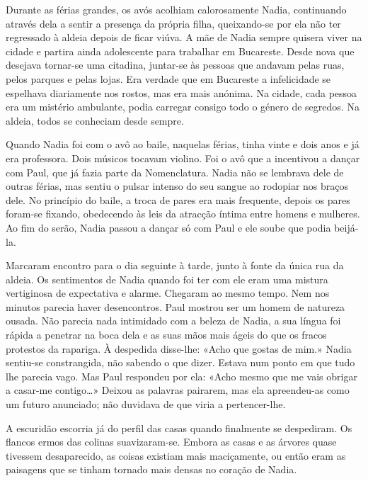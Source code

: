 Durante as férias grandes, os avós acolhiam calorosamente Nadia,
continuando através dela a sentir a presença da própria filha,
queixando-se por ela não ter regressado à aldeia depois de ficar viúva.
A mãe de Nadia sempre quisera viver na cidade e partira ainda
adolescente para trabalhar em Bucareste. Desde nova que desejava
tornar-se uma citadina, juntar-se às pessoas que andavam pelas ruas,
pelos parques e pelas lojas. Era verdade que em Bucareste a infelicidade
se espelhava diariamente nos rostos, mas era mais anónima. Na cidade,
cada pessoa era um mistério ambulante, podia carregar consigo todo o
género de segredos. Na aldeia, todos se conheciam desde sempre.

Quando Nadia foi com o avô ao baile, naquelas férias, tinha vinte e dois
anos e já era professora. Dois músicos tocavam violino. Foi o avô que a
incentivou a dançar com Paul, que já fazia parte da Nomenclatura. Nadia
não se
lembrava dele de outras férias, mas sentiu o pulsar intenso do seu
sangue ao rodopiar nos braços dele. No princípio do baile, a troca de
pares era mais frequente, depois os pares foram-se fixando, obedecendo
às leis da atracção íntima entre homens e mulheres. Ao fim do serão,
Nadia passou a dançar só com Paul e ele soube que podia beijá-la.

Marcaram encontro para o dia seguinte à tarde, junto à fonte da única
rua da aldeia. Os sentimentos de Nadia quando foi ter com ele eram uma
mistura vertiginosa de expectativa e alarme. Chegaram ao mesmo tempo.
Nem nos minutos parecia haver desencontros. Paul mostrou ser um homem de
natureza ousada. Não parecia nada intimidado com a beleza de Nadia, a
sua língua foi rápida a penetrar na boca dela e as suas mãos mais ágeis
do que os fracos protestos da rapariga. À despedida disse-lhe: «Acho que
gostas de mim.» Nadia sentiu-se constrangida, não sabendo o que dizer.
Estava num ponto em que tudo lhe parecia vago. Mas Paul respondeu por
ela: «Acho mesmo que me vais obrigar a casar-me contigo\ldots{}» Deixou
as palavras pairarem, mas ela apreendeu-as como um futuro anunciado; não
duvidava de que viria a pertencer-lhe.

A escuridão escorria já do perfil das casas quando finalmente se despediram. Os flancos ermos das colinas suavizaram-se. Embora
as casas e as árvores quase tivessem desaparecido, as coisas existiam
mais maciçamente, ou então eram as paisagens que se tinham tornado mais
densas no coração de Nadia.

